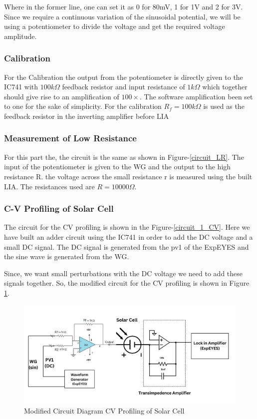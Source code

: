 \documentclass{article}
\begin{document}
\begin{multicols}{2}
Where in the former line, one can set it as 0 for 80mV, 1 for 1V and 2 for 3V. Since we require a continuous variation of the sinusoidal potential, we will be using a potentiometer to divide the voltage and get the required voltage amplitude. 

\subsubsection{Calibration}
For the Calibration the output from the potentiometer is directly given to the IC741 with $100k\Omega$ feedback resistor and input resistance of $1k\Omega$ which together should give rise to an amplification of $100\times$. The software amplification been set to one for the sake of simplicity. For the calibration $R_f=100k\Omega$ is used as the feedback resistor in the inverting amplifier before LIA

\subsubsection{Measurement of Low Resistance}
For this part the, the circuit is the same as shown in Figure-\ref{circuit_LR}. The input of the potentiometer is given to the WG and the output to the high resistance R. the voltage across the small resistance r is measured using the built LIA. The resistances used are $R=10000\Omega$.


\subsubsection{C-V Profiling of Solar Cell}

The circuit for the CV profiling is shown in the Figure-\ref{circuit_1_CV}. Here we have built an adder circuit using the IC741 in order to add the DC voltage and a small DC signal. The DC signal is generated from the pv1 of the ExpEYES and the sine wave is generated from the WG.

Since, we want small perturbations with the DC voltage we need to add these signals together. So, the modified circuit for the CV profiling is shown in Figure \ref{circuit_2_CV}.


\begin{figure}%
    \centering
    \includegraphics[width=2\columnwidth]{Images/CV_2.png}
    \caption{Modified Circuit Diagram CV Profiling of Solar Cell}
    \label{circuit_2_CV}
\end{figure}



\end{multicols}
\end{document}
